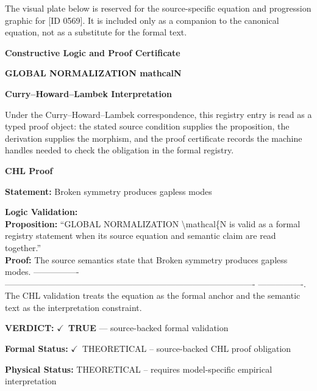 \begingroup\footnotesize\sloppy
The visual plate below is reserved for the source-specific equation and progression graphic for [ID 0569]. It is included only as a companion to the canonical equation, not as a substitute for the formal text.
\par\endgroup
\ifTZPDarkEdition
{}
\fi

\clearpage
\begingroup\tzpsupportsetup
\noindent\textbf{\fontsize{10.8pt}{12.8pt}\selectfont [ID 0569] Constructive Logic and Proof Certificate}\par
\noindent\textbf{\fontsize{10pt}{12pt}\selectfont GLOBAL NORMALIZATION mathcalN}\par
\vspace{0.45em}
\begingroup
\footnotesize
\setlength{\parskip}{0.22em}
\setlength{\parindent}{0pt}
\noindent\textbf{Curry--Howard--Lambek Interpretation}\par
Under the Curry--Howard--Lambek correspondence, this registry entry is read as a typed proof
object: the stated source condition supplies the proposition, the derivation supplies the
morphism, and the proof certificate records the machine handles needed to check the obligation
in the formal registry.

\vspace{0.45em}
\noindent\textbf{CHL Proof}\par
\textbf{Statement:} Broken symmetry produces gapless modes

\textbf{Logic Validation:}\\
\textbf{Proposition:} ``GLOBAL NORMALIZATION \textbackslash{}mathcal\{N is valid as a formal registry statement when its source
equation and semantic claim are read together.''\\
\textbf{Proof:} The source semantics state that Broken symmetry produces gapless modes. ----------------
----------------------------------------------------------------------------------------
----------------. The CHL validation treats the equation as the formal anchor and the
semantic text as the interpretation constraint.

\textbf{VERDICT:} \ensuremath{\checkmark}\ \textbf{TRUE} --- source-backed formal validation

\textbf{Formal Status:} \ensuremath{\checkmark}\ THEORETICAL -- source-backed CHL proof obligation

\textbf{Physical Status:} THEORETICAL -- requires model-specific empirical interpretation
\par\vspace{0.45em}
\par
\ifTZPDarkEdition
{}
\fi
\endgroup
\endgroup
